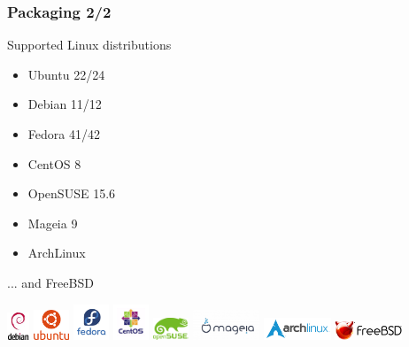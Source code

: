 \documentclass[aspectratio=169]{beamer}
\begin{document}
\begin{frame}
\frametitle{Packaging 2/2}
\begin{block}{Supported Linux distributions}
\begin{itemize}
\item Ubuntu 22/24
\item Debian 11/12
\item Fedora 41/42
\item CentOS 8
\item OpenSUSE 15.6
\item Mageia 9
\item ArchLinux
\end{itemize}

... and FreeBSD

\end{block}


\begin{center}
\includegraphics[width=0.05\textwidth]{figures/debian-openlogo-100}
\includegraphics[width=0.08\textwidth]{figures/ubuntu}
\includegraphics[width=0.08\textwidth]{figures/Fedora-Logo}
\includegraphics[width=0.08\textwidth]{figures/centos-logo}
\includegraphics[width=0.08\textwidth]{figures/opensuse-logo}
\includegraphics[width=0.15\textwidth]{figures/200px-Logo_mageia_official}
\includegraphics[width=0.15\textwidth]{figures/archlinux-logo}
\includegraphics[width=0.15\textwidth]{figures/FREEBSD_Logo_Horiz_Pos_RGB}
\end{center}

\end{frame}
\end{document}
